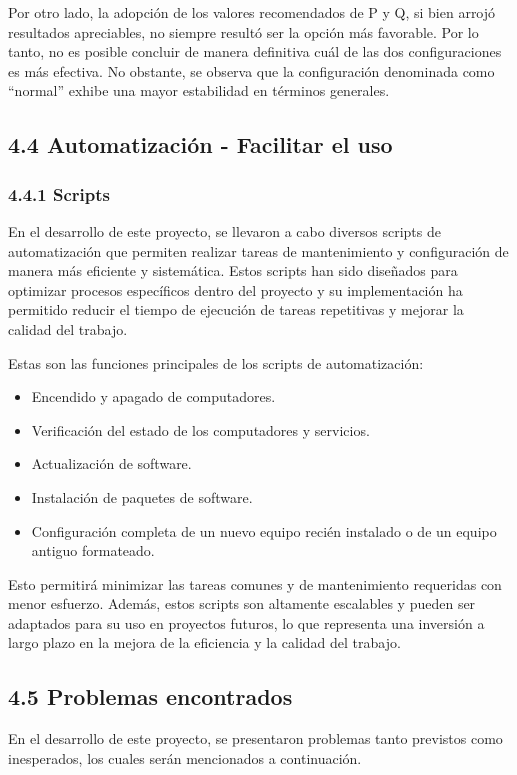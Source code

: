 \begin{spacing}{1.5}
  Por otro lado, la adopción de los valores recomendados de P y Q, si bien arrojó resultados apreciables, no siempre resultó ser la opción más favorable. Por lo tanto, no es posible concluir de manera definitiva cuál de las dos configuraciones es más efectiva. No obstante, se observa que la configuración denominada como ``normal'' exhibe una mayor estabilidad en términos generales.

  \subsection{4.4 Automatización - Facilitar el uso}   \label{chap:4.4}

  \subsubsection{4.4.1 Scripts}

  En el desarrollo de este proyecto, se llevaron a cabo diversos scripts de
  automatización que permiten realizar tareas de mantenimiento y configuración
  de
  manera más eficiente y sistemática. Estos scripts han sido diseñados para
  optimizar procesos específicos dentro del proyecto y su implementación ha
  permitido reducir el tiempo de ejecución de tareas repetitivas y mejorar la
  calidad del trabajo.

  Estas son las funciones principales de los scripts de automatización:

  \begin{itemize}
    \item Encendido y apagado de computadores.
    \item Verificación del estado de los computadores y servicios.
    \item Actualización de software.
    \item Instalación de paquetes de software.
    \item Configuración completa de un nuevo equipo recién instalado o de
          un equipo antiguo formateado.
  \end{itemize}

  Esto permitirá minimizar las tareas comunes y de mantenimiento requeridas
  con menor esfuerzo. Además, estos scripts son altamente escalables y pueden
  ser
  adaptados para su uso en proyectos futuros, lo que representa una inversión a
  largo plazo en la mejora de la eficiencia y la calidad del trabajo.\cite{github}

  \subsection{4.5 Problemas encontrados}
  En el desarrollo de este proyecto, se presentaron problemas tanto previstos
  como inesperados, los cuales serán mencionados a continuación.


\end{spacing}
